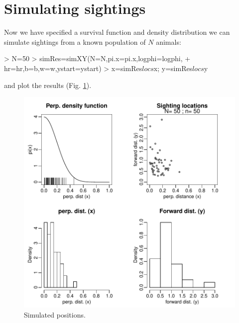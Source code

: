 \documentclass{article}
\begin{document}
\section{Simulating sightings}
Now we have specified a survival function and density distribution we can simulate sightings from a known population of $N$ animals:
\begin{Schunk}
\begin{Sinput}
> N=50
> simRes=simXY(N=N,pi.x=pi.x,logphi=logphi,
+               hr=hr,b=b,w=w,ystart=ystart)
> x=simRes$locs$x; y=simRes$locs$y 
\end{Sinput}
\end{Schunk}
and plot the results (Fig. \ref{fig:simXY}).
\begin{figure}
\begin{centering}
\includegraphics{simulations-figXYsim}
\caption{Simulated positions.} \label{fig:simXY}
\end{centering}
\end{figure}
\end{document}
